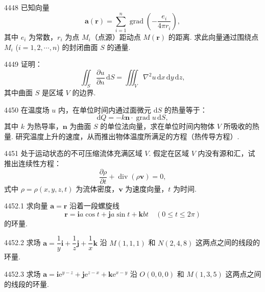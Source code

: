 \begin{prob}[M]{4448}
已知向量
\[
\boldsymbol{a}(\boldsymbol{r}) = \sum_{i=1}^n \operatorname{grad}\left( -\frac{e_i}{4\pi r_i} \right),
\]
其中 $e_i$ 为常数，$r_i$ 为点 $M_i$（点源）距动点 $M(\boldsymbol{r})$ 的距离. 求此向量通过围绕点 $M_i$ ($i = 1, 2, \cdots, n$) 的封闭曲面 $S$ 的通量.
\end{prob}

\begin{prob}[M]{4449}
证明：
\[
\iint_S \frac{\partial u}{\partial n} \,\mathrm{d}S = \iiint_V \nabla^2 u \,\mathrm{d}x\,\mathrm{d}y\,\mathrm{d}z,
\]
其中曲面 $S$ 是区域 $V$ 的边界.
\end{prob}

\begin{prob}[M]{4450}
在温度场 $u$ 内，在单位时间内通过面微元 $\mathrm{d}S$ 的热量等于：
\[
\mathrm{d}Q = -k \boldsymbol{n} \cdot \operatorname{grad} u \,\mathrm{d}S,
\]
其中 $k$ 为热导率，$\boldsymbol{n}$ 为曲面 $S$ 的单位法向量，求在单位时间内物体 $V$ 所吸收的热量. 研究温度上升的速度，从而推出物体温度所满足的方程（热传导方程）.
\end{prob}

\begin{prob}[M]{4451}
处于运动状态的不可压缩流体充满区域 $V$. 假定在区域 $V$ 内没有源和汇，试推出连续性方程：
\[
\frac{\partial \rho}{\partial t} + \operatorname{div}(\rho \boldsymbol{v}) = 0,
\]
式中 $\rho = \rho(x, y, z, t)$ 为流体密度，$\boldsymbol{v}$ 为速度向量，$t$ 为时间.
\end{prob}

\begin{prob}[M]{4452.1}
求向量 $\boldsymbol{a} = \boldsymbol{r}$ 沿着一段螺旋线
\[
\boldsymbol{r} = \boldsymbol{i}a\cos t + \boldsymbol{j}a\sin t + \boldsymbol{k}bt \quad (0 \leqslant t \leqslant 2\pi)
\]
的环量.
\end{prob}

\begin{prob}[M]{4452.2}
求场 $\boldsymbol{a} = \dfrac{1}{y}\boldsymbol{i} + \dfrac{1}{z}\boldsymbol{j} + \dfrac{1}{x}\boldsymbol{k}$ 沿 $M(1, 1, 1)$ 和 $N(2, 4, 8)$ 这两点之间的线段的环量.
\end{prob}

\begin{prob}[M]{4452.3}
求场 $\boldsymbol{a} = \boldsymbol{i}\mathrm{e}^{y-z} + \boldsymbol{j}\mathrm{e}^{z-x} + \boldsymbol{k}\mathrm{e}^{x-y}$ 沿 $O(0, 0, 0)$ 和 $M(1, 3, 5)$ 这两点之间的线段的环量.
\end{prob}


